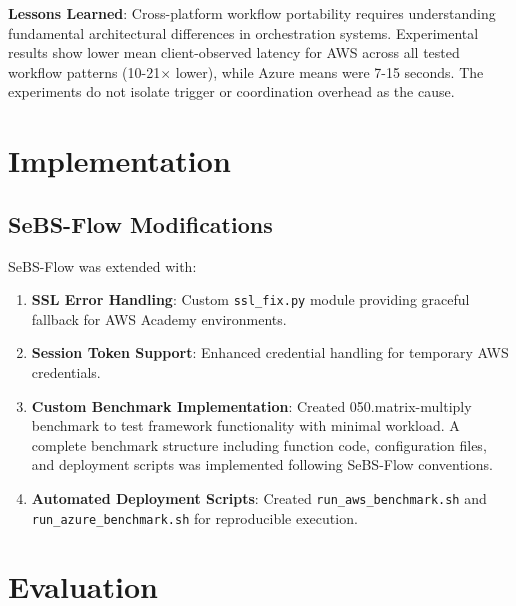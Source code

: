 \documentclass[sigconf,nonacm]{acmart}
\begin{document}
\textbf{Lessons Learned}: Cross-platform workflow portability requires understanding fundamental architectural differences in orchestration systems. Experimental results show lower mean client-observed latency for AWS across all tested workflow patterns (10-21$\times$ lower), while Azure means were 7-15 seconds. The experiments do not isolate trigger or coordination overhead as the cause.

\section{Implementation}

\subsection{SeBS-Flow Modifications}

SeBS-Flow was extended with:

\begin{enumerate}
    \item \textbf{SSL Error Handling}: Custom \texttt{ssl\_fix.py} module providing graceful fallback for AWS Academy environments.
    \item \textbf{Session Token Support}: Enhanced credential handling for temporary AWS credentials.
    \item \textbf{Custom Benchmark Implementation}: Created 050.matrix-multiply benchmark to test framework functionality with minimal workload. A complete benchmark structure including function code, configuration files, and deployment scripts was implemented following SeBS-Flow conventions.
    \item \textbf{Automated Deployment Scripts}: Created \texttt{run\_aws\_benchmark.sh} and \texttt{run\_azure\_benchmark.sh} for reproducible execution.
\end{enumerate}

\section{Evaluation}
\end{document}

